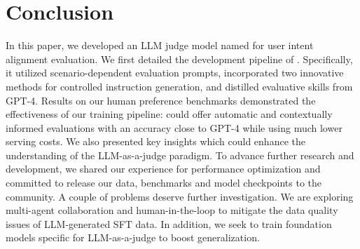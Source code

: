 \section{Conclusion}
\label{sec:conclusion}

In this paper, we developed an LLM judge model named \modelname for user intent alignment evaluation. We first detailed the development pipeline of \modelname. Specifically, it utilized scenario-dependent evaluation prompts, incorporated two innovative methods for controlled instruction generation, and distilled evaluative skills from GPT-4. Results on our human preference benchmarks demonstrated the effectiveness of our training pipeline: \modelname could offer automatic and contextually informed evaluations with an accuracy close to GPT-4 while using much lower serving costs. We also presented key insights which could enhance the understanding of the LLM-as-a-judge paradigm. To advance further research and development, we shared our experience for performance optimization and committed to release our data, benchmarks and model checkpoints to the community. A couple of problems deserve further investigation. We are exploring multi-agent collaboration and human-in-the-loop to mitigate the data quality issues of LLM-generated SFT data. In addition, we seek to train
foundation models specific for LLM-as-a-judge to boost generalization.


